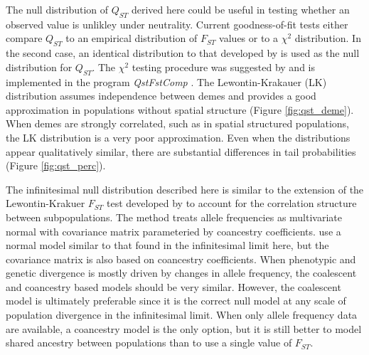 The null distribution of $Q_{ST}$ derived here could be useful in testing
whether an observed value is unlikley under neutrality. Current goodness-of-fit
tests either compare $Q_{ST}$ to an empirical distribution of $F_{ST}$ values or
to a $\chi^2$ distribution. In the second case, an identical distribution to
that developed by \citet{Lewontin1973} is used as the null distribution for
$Q_{ST}$. The $\chi^2$ testing procedure was suggested by \citet{Whitlock2009}
and is implemented in the program \textit{QstFstComp} \citep{Gilbert2015}. The
Lewontin-Krakauer (LK) distribution assumes independence between demes and
provides a good approximation in populations without spatial structure (Figure
\ref{fig:qst_deme}). When demes are strongly correlated, such as in spatial
structured populations, the LK distribution is a very poor approximation. Even
when the distributions appear qualitatively similar, there are substantial
differences in tail probabilities (Figure \ref{fig:qst_perc}).

The infinitesimal null distribution described here is similar to the extension
of the Lewontin-Krakuer $F_{ST}$ test developed by \citet{Bonhomme2010} to
account for the correlation structure between subpopulations. The
\citet{Bonhomme2010} method treats allele frequencies as multivariate normal
with covariance matrix parameteried by coancestry coefficients.
\citet{Ovaskainen2011} use a normal model similar to that found in the
infinitesimal limit here, but the covariance matrix is also based on coancestry
coefficients. When phenotypic and genetic divergence is mostly driven by changes
in allele frequency, the coalescent and coancestry based models should be very
similar. However, the coalescent model is ultimately preferable since it is the
correct null model at any scale of population divergence in the infinitesimal
limit. When only allele frequency data are available, a coancestry model is the
only option, but it is still better to model shared ancestry between populations
than to use a single value of $F_{ST}$.
